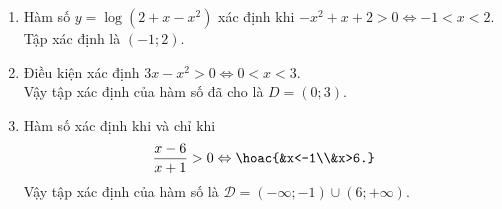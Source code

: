 \begin{bt}
{\begin{enumerate}
			Tập xác định $\mathscr{D}=\mathbb{R} \setminus \{-2\}$.
			\item Hàm số $y=\log \left(2+x-x^2\right)$ xác định khi $ -x^2+x+2>0\Leftrightarrow -1<x<2 $.
			\\
			Tập xác định là $(-1 ; 2)$.
			\item 	Điều kiện xác định $3x-x^2>0 \Leftrightarrow 0<x<3$.\\
			Vậy tập xác định của hàm số đã cho là $D= (0; 3)$.
			\item Hàm số xác định khi và chỉ khi
			\[\dfrac{x-6}{x+1}>0 \Leftrightarrow \hoac{&x<-1\\&x>6.}\]
			Vậy tập xác định của hàm số là $\mathscr{D}=(-\infty;-1)\cup (6;+\infty)$.
		\end{enumerate}
		
		
	}
\end{bt}
